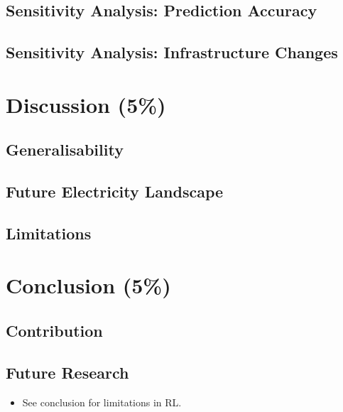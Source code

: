\documentclass[12pt, article]{article}
\begin{document}
\subsection{Sensitivity Analysis: Prediction Accuracy}
\label{sec:org249589d}
\subsection{Sensitivity Analysis: Infrastructure Changes}
\label{sec:orgf12276d}
\section{Discussion (5\%)}
\label{sec:orgcdd913a}
\subsection{Generalisability}
\label{sec:orgd14040f}
\subsection{Future Electricity Landscape}
\label{sec:org0acfb06}
\subsection{Limitations}
\label{sec:orga86691b}
\section{Conclusion (5\%)}
\label{sec:org6150029}
\subsection{Contribution}
\label{sec:org75f7b04}
\subsection{Future Research}
\label{sec:orgf9632db}



\clearpage
\printbibliography

\begin{itemize}
\item See \parencite{vazquez-canteli19_reinf_learn_deman_respon} conclusion for
limitations in RL.
\end{itemize}
\end{document}
